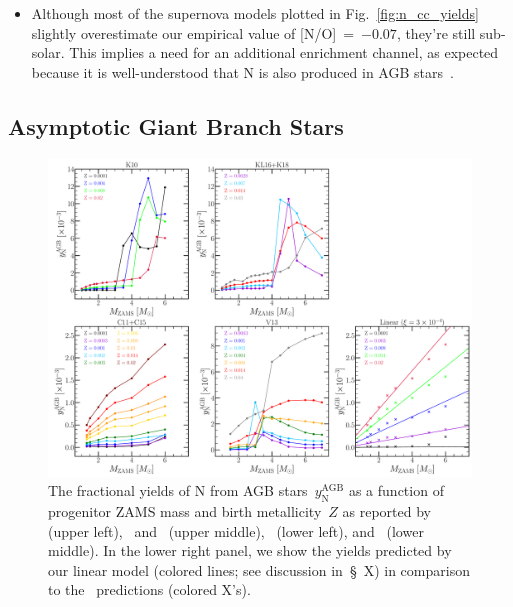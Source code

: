 \documentclass[ms.tex]{subfiles}
\begin{document}
\begin{itemize}
	\item Although most of the supernova models plotted in 
	Fig.~\ref{fig:n_cc_yields} slightly overestimate our empirical value of 
	[N/O]\subcc~=~$-0.07$, they're still sub-solar. 
	This implies a need for an additional enrichment channel, as expected 
	because it is well-understood that N is also produced in AGB 
	stars~\citep{Johnson2019}. 
\end{itemize} 

\subsection{Asymptotic Giant Branch Stars} 
\label{sec:yields:agb} 

\begin{figure} 
\centering 
\includegraphics[scale = 0.33]{agb_yield_models.pdf} 
\caption{
The fractional yields of N from AGB stars~$y_\text{N}^\text{AGB}$ as a function 
of progenitor ZAMS mass and birth metallicity~$Z$ as reported 
by~\citet{Karakas2010} (upper left),~\citet{Karakas2016} and~\citet{Karakas2018} 
(upper middle),~\citet{Cristallo2011, Cristallo2015} (lower left), 
and~\citet{Ventura2013} (lower middle). 
In the lower right panel, we show the yields predicted by our linear model 
(colored lines; see discussion in~\S~X) in comparison to 
the~\citet{Cristallo2011, Cristallo2015} predictions (colored X's). 
}
\label{fig:agb_yield_models} 
\end{figure} 
\end{document}
